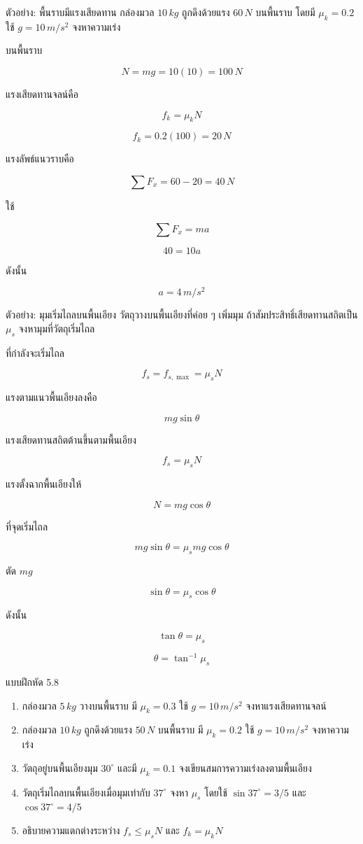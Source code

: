 \begin{examplebox}{ตัวอย่าง: พื้นราบมีแรงเสียดทาน}
กล่องมวล $10\,\si{kg}$ ถูกดึงด้วยแรง $60\,\si{N}$ บนพื้นราบ โดยมี $\mu_k=0.2$ ใช้ $g=10\,\si{m/s^2}$ จงหาความเร่ง

บนพื้นราบ

\[
N=mg=10(10)=100\,\si{N}
\]

แรงเสียดทานจลน์คือ

\[
f_k=\mu_k N
\]

\[
f_k=0.2(100)=20\,\si{N}
\]

แรงลัพธ์แนวราบคือ

\[
\sum F_x=60-20=40\,\si{N}
\]

ใช้

\[
\sum F_x=ma
\]

\[
40=10a
\]

ดังนั้น

\[
\boxed{a=4\,\si{m/s^2}}
\]
\end{examplebox}

\begin{examplebox}{ตัวอย่าง: มุมเริ่มไถลบนพื้นเอียง}
วัตถุวางบนพื้นเอียงที่ค่อย ๆ เพิ่มมุม ถ้าสัมประสิทธิ์เสียดทานสถิตเป็น $\mu_s$ จงหามุมที่วัตถุเริ่มไถล

ที่กำลังจะเริ่มไถล

\[
f_s=f_{s,\max}=\mu_s N
\]

แรงตามแนวพื้นเอียงลงคือ

\[
mg\sin\theta
\]

แรงเสียดทานสถิตต้านขึ้นตามพื้นเอียง

\[
f_s=\mu_s N
\]

แรงตั้งฉากพื้นเอียงให้

\[
N=mg\cos\theta
\]

ที่จุดเริ่มไถล

\[
mg\sin\theta=\mu_s mg\cos\theta
\]

ตัด $mg$

\[
\sin\theta=\mu_s\cos\theta
\]

ดังนั้น

\[
\tan\theta=\mu_s
\]

\[
\boxed{\theta=\tan^{-1}\mu_s}
\]
\end{examplebox}

\begin{exercisebox}{แบบฝึกหัด 5.8}
\begin{enumerate}
    \item กล่องมวล $5\,\si{kg}$ วางบนพื้นราบ มี $\mu_k=0.3$ ใช้ $g=10\,\si{m/s^2}$ จงหาแรงเสียดทานจลน์
    \item กล่องมวล $10\,\si{kg}$ ถูกดึงด้วยแรง $50\,\si{N}$ บนพื้นราบ มี $\mu_k=0.2$ ใช้ $g=10\,\si{m/s^2}$ จงหาความเร่ง
    \item วัตถุอยู่บนพื้นเอียงมุม $30^\circ$ และมี $\mu_k=0.1$ จงเขียนสมการความเร่งลงตามพื้นเอียง
    \item วัตถุเริ่มไถลบนพื้นเอียงเมื่อมุมเท่ากับ $37^\circ$ จงหา $\mu_s$ โดยใช้ $\sin37^\circ=3/5$ และ $\cos37^\circ=4/5$
    \item อธิบายความแตกต่างระหว่าง $f_s\leq \mu_sN$ และ $f_k=\mu_kN$
\end{enumerate}
\end{exercisebox}

